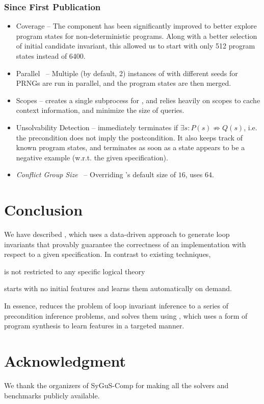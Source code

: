 \documentclass[conference]{IEEEtran}
\begin{document}
\subsubsection*{Since First Publication~\citep{Padhi2016DatadrivenPI}}
\begin{itemize}
    \item \Record Coverage --
          The \Record component has been significantly improved to better explore program states for non-deterministic programs.
          Along with a better selection of initial candidate invariant,
          this allowed us to start with only 512 program states instead of 6400.

    \item Parallel \Record\ --
          Multiple (by default, 2) instances of \Record with different seeds for PRNGs are run in parallel,
          and the program states are then merged.

    \item {} Scopes --
          \LoopInvGen creates a single subprocess for , and relies heavily on scopes to cache context information,
          and minimize the size of queries.

    \item Unsolvability Detection --
          \LoopInvGen immediately terminates if $\exists s\colon P(s) \not\Rightarrow Q(s)$,
          i.e. the precondition does not imply the postcondition.
          It also keeps track of known program states, and terminates as soon as a state appears to be a negative example
          (w.r.t. the given specification).

    \item \emph{Conflict Group Size}~\citep{Padhi2016DatadrivenPI} --
          Overriding \PIE's default size of $16$, \LoopInvGen uses $64$.
\end{itemize}




\section{Conclusion} \label{subsec:Conclusion}

\noindent
We have described \LoopInvGen, which uses a data-driven approach to generate loop invariants
that provably guarantee the correctness of an implementation with respect to a given specification.
In contrast to existing techniques, \LoopInvGen
\begin{andlist}
    \item is not restricted to any specific logical theory
    \item starts with no initial features and learns them automatically on demand.
\end{andlist}
In essence, \LoopInvGen reduces the problem of loop invariant inference to a series of precondition inference problems,
and solves them using \PIE, which uses a form of program synthesis to learn features in a targeted manner.





\section*{Acknowledgment}

\noindent
We thank the organizers of SyGuS-Comp for making all the solvers and benchmarks publicly available.





\begingroup
  \small
  
\endgroup
\end{document}
